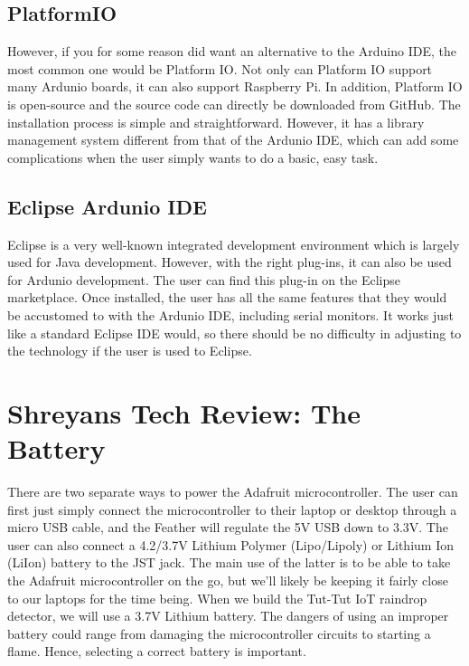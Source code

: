 \documentclass[letterpaper,10pt,draftclsnofoot,onecolumn]{article}
\begin{document}
\subsection{PlatformIO}
However, if you for some reason did want an alternative to the Arduino IDE, the most common one would be Platform IO. \cite{DZone} Not only can Platform IO support many Ardunio boards, it can also support Raspberry Pi. In addition, Platform IO is open-source and the source code can directly be downloaded from GitHub. The installation process is simple and straightforward. However, it has a library management system different from that of the Ardunio IDE, which can add some complications when the user simply wants to do a basic, easy task. \cite{FrancescoAzzola}
\subsection{Eclipse Ardunio IDE}
Eclipse is a very well-known integrated development environment which is largely used for Java development. However, with the right plug-ins, it can also be used for Ardunio development. The user can find this plug-in on the Eclipse marketplace. Once installed, the user has all the same features that they would be accustomed to with the Ardunio IDE, including serial monitors. It works just like a standard Eclipse IDE would, so there should be no difficulty in adjusting to the technology if the user is used to Eclipse. \cite{DZone}

\section{Shreyans Tech Review: The Battery}
There are two separate ways to power the Adafruit microcontroller. The user can first just simply connect the microcontroller to their laptop or desktop through a micro USB cable, and the Feather will regulate the 5V USB down to 3.3V. The user can also connect a 4.2/3.7V Lithium Polymer (Lipo/Lipoly) or Lithium Ion (LiIon) battery to the JST jack. The main use of the latter is to be able to take the Adafruit microcontroller on the go, but we'll likely be keeping it fairly close to our laptops for the time being. When we build the Tut-Tut IoT raindrop detector, we will use a 3.7V Lithium battery.
\newline
The dangers of using an improper battery could range from damaging the microcontroller circuits to starting a flame. Hence, selecting a correct battery is important. \cite{LadyAda}
\end{document}
